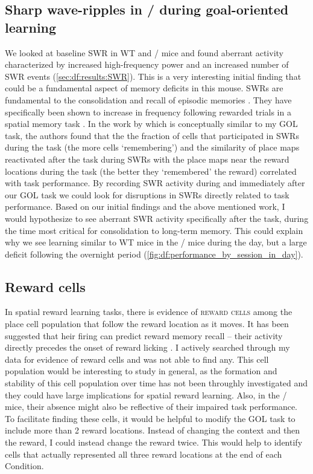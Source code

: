 \subsection{Sharp wave-ripples in \df/ during goal-oriented learning}
We looked at baseline \ac{SWR} in WT and \df/ mice and found aberrant activity characterized by increased high-frequency power and an increased number of \ac{SWR} events (\autoref{sec:df:results:SWR}).
This is a very interesting initial finding that could be a fundamental aspect of memory deficits in this mouse.
SWRs are fundamental to the consolidation and recall of episodic memories \citep[reviewed in,][]{Buzsaki2015}.
They have specifically been shown to increase in frequency following rewarded trials in a spatial memory task \citep{Singer2009}.
In the work by \citeauthor{Dupret2010a} which is conceptually similar to my \ac{GOL} task, the authors found that the the fraction of cells that participated in SWRs during the task (the more cells `remembering') and the similarity of place maps reactivated after the task during SWRs with the place maps near the reward locations during the task (the better they `remembered' the reward) correlated with task performance.
By recording \ac{SWR} activity during and immediately after our \ac{GOL} task we could  look for disruptions in SWRs directly related to task performance.
Based on our initial findings and the above mentioned work, I would hypothesize to see aberrant \ac{SWR} activity specifically after the task, during the time most critical for consolidation to long-term memory.
This could explain why we see learning similar to WT mice in the \df/ mice during the day, but a large deficit following the overnight period (\autoref{fig:df:performance_by_session_in_day}).

\subsection{Reward cells}
In spatial reward learning tasks, there is evidence of \textsc{reward cells} among the place cell population that follow the reward location as it moves.
It has been suggested that heir firing can predict reward memory recall -- their activity directly precedes the onset of reward licking \citep{XXXX}.
I actively searched through my data for evidence of reward cells and was not able to find any.
This cell population would be interesting to study in general, as the formation and stability of this cell population over time has not been throughly investigated and they could have large implications for spatial reward learning.
Also, in the \df/ mice, their absence might also be reflective of their impaired task performance.
To facilitate finding these cells, it would be helpful to modify the \ac{GOL} task to include more than 2 reward locations.
Instead of changing the context and then the reward, I could instead change the reward twice.
This would help to identify cells that actually represented all three reward locations at the end of each Condition.

